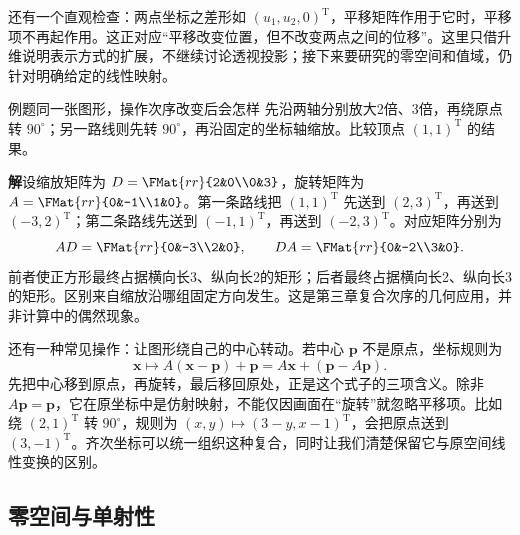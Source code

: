 \documentclass[a4paper,12pt,twoside,openany,fontset=none]{ctexbook}
\newcounter{example}[chapter]
\newenvironment{example}[1][]{\begin{exBox}{例题}{#1}}{\end{exBox}}
\numberwithin{equation}{chapter}
\begin{document}
还有一个直观检查：两点坐标之差形如 $(u_1,u_2,0)^{\mathrm T}$，平移矩阵作用于它时，平移项不再起作用。这正对应“平移改变位置，但不改变两点之间的位移”。这里只借升维说明表示方式的扩展，不继续讨论透视投影；接下来要研究的零空间和值域，仍针对明确给定的线性映射。


\begin{example}[同一张图形，操作次序改变后会怎样]
先沿两轴分别放大2倍、3倍，再绕原点转 $90^\circ$；另一路线则先转 $90^\circ$，再沿固定的坐标轴缩放。比较顶点 $(1,1)^{\mathrm T}$ 的结果。
\end{example}
\textbf{解}\quad 设缩放矩阵为 $D=\FMat{rr}{2&0\\0&3}$，旋转矩阵为 $A=\FMat{rr}{0&-1\\1&0}$。第一条路线把 $(1,1)^{\mathrm T}$ 先送到 $(2,3)^{\mathrm T}$，再送到 $(-3,2)^{\mathrm T}$；第二条路线先送到 $(-1,1)^{\mathrm T}$，再送到 $(-2,3)^{\mathrm T}$。对应矩阵分别为
\[
 AD=\FMat{rr}{0&-3\\2&0},\qquad
 DA=\FMat{rr}{0&-2\\3&0}.
\]
前者使正方形最终占据横向长3、纵向长2的矩形；后者最终占据横向长2、纵向长3的矩形。区别来自缩放沿哪组固定方向发生。这是第三章复合次序的几何应用，并非计算中的偶然现象。

还有一种常见操作：让图形绕自己的中心转动。若中心 $\boldsymbol p$ 不是原点，坐标规则为
\[
 \boldsymbol x\longmapsto A(\boldsymbol x-\boldsymbol p)+\boldsymbol p
 =A\boldsymbol x+(\boldsymbol p-A\boldsymbol p).
\]
先把中心移到原点，再旋转，最后移回原处，正是这个式子的三项含义。除非 $A\boldsymbol p=\boldsymbol p$，它在原坐标中是仿射映射，不能仅因画面在“旋转”就忽略平移项。比如绕 $(2,1)^{\mathrm T}$ 转 $90^\circ$，规则为 $(x,y)\mapsto(3-y,x-1)^{\mathrm T}$，会把原点送到 $(3,-1)^{\mathrm T}$。齐次坐标可以统一组织这种复合，同时让我们清楚保留它与原空间线性变换的区别。

\subsection{零空间与单射性}
\label{sec:four-null-injective}

\end{document}
